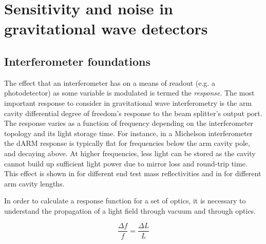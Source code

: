 \chapter{Sensitivity and noise in gravitational wave detectors}
\label{c:instrumentation}


\section{Interferometer foundations}

The effect that an interferometer has on a means of readout (e.g. a photodetector) as some variable is modulated is termed the \emph{response}. The most important response to consider in gravitational wave interferometry is the arm cavity differential degree of freedom's response to the beam splitter's output port. The response varies as a function of frequency depending on the interferometer topology and its light storage time. For instance, in a Michelson interferometer the dARM response is typically flat for frequencies below the arm cavity pole, and decaying  above. At higher frequencies, less light can be stored as the cavity cannot build up sufficient light power due to mirror loss and round-trip time. This effect is shown in  for different end test mass reflectivities and in  for different arm cavity lengths.

In order to calculate a response function for a set of optics, it is necessary to understand the propagation of a light field through vacuum and through optics.


\begin{equation}
  \label{eq:freq-to-length}
  \frac{\Delta f}{f} = \frac{\Delta L}{L}
\end{equation}


